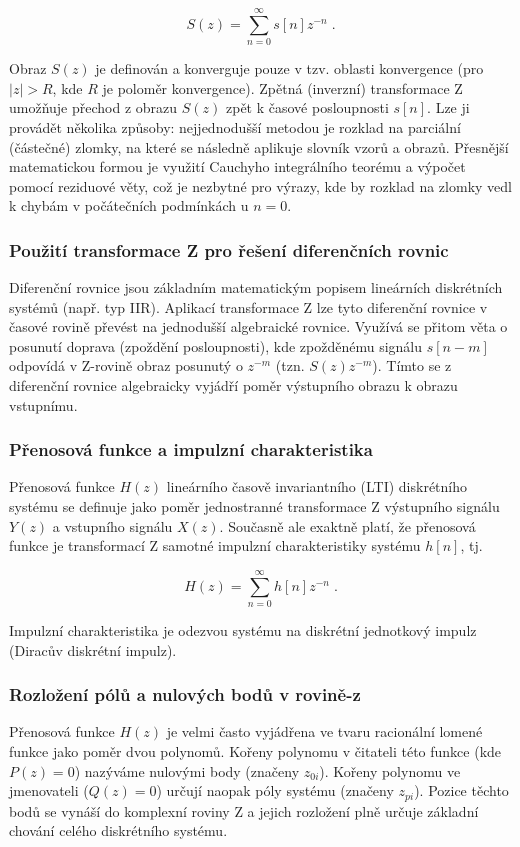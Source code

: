         \begin{equation*}
        S(z) = \sum_{n=0}^{\infty} s[n] z^{-n} \;.
        \end{equation*}
        
        Obraz $S(z)$ je definován a konverguje pouze v tzv. oblasti konvergence (pro $|z| > R$, kde $R$ je poloměr konvergence). Zpětná (inverzní) transformace Z umožňuje přechod z obrazu $S(z)$ zpět k časové posloupnosti $s[n]$. Lze ji provádět několika způsoby: nejjednodušší metodou je rozklad na parciální (částečné) zlomky, na které se následně aplikuje slovník vzorů a obrazů. Přesnější matematickou formou je využití Cauchyho integrálního teorému a výpočet pomocí reziduové věty, což je nezbytné pro výrazy, kde by rozklad na zlomky vedl k chybám v počátečních podmínkách u $n = 0$.
    \subsubsection{Použití transformace Z pro řešení diferenčních rovnic} 
        Diferenční rovnice jsou základním matematickým popisem lineárních diskrétních systémů (např. typ IIR). Aplikací transformace Z lze tyto diferenční rovnice v časové rovině převést na jednodušší algebraické rovnice. Využívá se přitom věta o posunutí doprava (zpoždění posloupnosti), kde zpožděnému signálu $s[n - m]$ odpovídá v Z-rovině obraz posunutý o $z^{-m}$ (tzn. $S(z)z^{-m}$). Tímto se z diferenční rovnice algebraicky vyjádří poměr výstupního obrazu k obrazu vstupnímu.

    \subsubsection{Přenosová funkce a impulzní charakteristika} 
        Přenosová funkce $H(z)$ lineárního časově invariantního (LTI) diskrétního systému se definuje jako poměr jednostranné transformace Z výstupního signálu $Y(z)$ a vstupního signálu $X(z)$. Současně ale exaktně platí, že přenosová funkce je transformací Z samotné impulzní charakteristiky systému $h[n]$, tj.

        \begin{equation*}
        H(z) = \sum_{n=0}^{\infty} h[n]z^{-n} \;.
        \end{equation*}

        Impulzní charakteristika je odezvou systému na diskrétní jednotkový impulz (Diracův diskrétní impulz).

    \subsubsection{Rozložení pólů a nulových bodů v rovině-z}
        Přenosová funkce $H(z)$ je velmi často vyjádřena ve tvaru racionální lomené funkce jako poměr dvou polynomů. Kořeny polynomu v čitateli této funkce (kde $P(z) = 0$) nazýváme nulovými body (značeny $z_{0i}$). Kořeny polynomu ve jmenovateli ($Q(z) = 0$) určují naopak póly systému (značeny $z_{pi}$). Pozice těchto bodů se vynáší do komplexní roviny Z a jejich rozložení plně určuje základní chování celého diskrétního systému.


